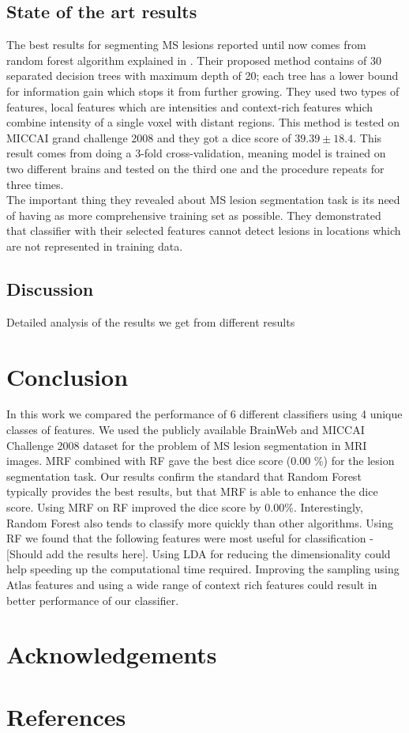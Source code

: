 \documentclass{article} %
\begin{document}
\subsection{State of the art results}
The best results for segmenting MS lesions reported until now comes from random forest algorithm explained in \cite{geremia2011spatial}. Their proposed method contains of 30 separated decision trees with maximum depth of 20; each tree has a lower bound for information gain which stops it from further growing. They used two types of features, local features which are intensities and context-rich features which combine intensity of a single voxel with distant regions. This method is tested on MICCAI grand challenge 2008 and they got a dice score of $39.39 \pm 18.4$. This result comes from doing a 3-fold cross-validation, meaning model is trained on two different brains and tested on the third one and the procedure repeats for three times.\\
The important thing they revealed about MS lesion segmentation task is its need of having as more comprehensive training set as possible. They demonstrated that classifier with their selected features cannot detect lesions in locations which are not represented in training data.
\subsection{Discussion}
Detailed analysis of the results we get from different results

\section{Conclusion}
In this work we compared the performance of 6 different classifiers using 4 unique classes of features. We used the publicly available BrainWeb and MICCAI Challenge 2008 dataset for the problem of MS lesion segmentation in MRI images. MRF combined with RF gave the best dice score (0.00 \%) for the lesion segmentation task. Our results confirm the standard \cite{garcia2013review} that Random Forest typically provides the best results, but that MRF is able to enhance the dice score. Using MRF on RF improved the dice score by 0.00\%. Interestingly, Random Forest also tends to classify more quickly than other algorithms. Using RF we found that the following features were most useful for classification - [Should add the results here]. Using LDA for reducing the dimensionality could help speeding up the computational time required. Improving the sampling using Atlas features and using a wide range of context rich features could result in better performance of our classifier.


\section{Acknowledgements}


\section{References}



\end{document}
